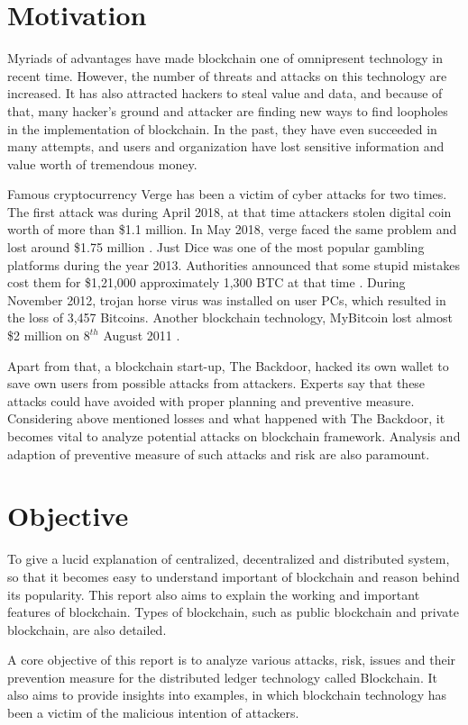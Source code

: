 \documentclass[a4paper,twoside,12pt]{report}
\begin{document}
\begin{spacing}{1.5}
\section{Motivation}
Myriads of advantages have made blockchain one of omnipresent technology in recent time. However, the number of threats and attacks on this technology are increased. It has also attracted hackers to steal value and data, and because of that, many hacker's ground and attacker are finding new ways to find loopholes in the implementation of blockchain. In the past, they have even succeeded in many attempts, and users and organization have lost sensitive information and value worth of tremendous money.
\par
Famous cryptocurrency Verge has been a victim of cyber attacks for two times. The first attack was during April 2018, at that time attackers stolen digital coin worth of more than \$1.1 million. In May 2018, verge faced the same problem and lost around \$1.75 million \cite{verge_51_attack}. Just Dice was one of the most popular gambling platforms during the year 2013. Authorities announced that some stupid mistakes cost them for \$1,21,000 approximately 1,300 BTC at that time \cite{all_bitcoin_scam}. During November 2012, trojan horse virus was installed on user PCs, which resulted in the loss of 3,457 Bitcoins. Another blockchain technology, MyBitcoin lost almost \$2 million on $8^{th}$  August 2011 \cite{mybitcoin_hack}. 
\par
Apart from that, a blockchain start-up, The Backdoor, hacked its own wallet to save own users from possible attacks from attackers. Experts say that these attacks could have avoided with proper planning and preventive measure. Considering above mentioned losses and what happened with The Backdoor, it becomes vital to analyze potential attacks on blockchain framework. Analysis and adaption of preventive measure of such attacks and risk are also paramount. 
\section{Objective}
To give a lucid explanation of centralized, decentralized and distributed system, so that it becomes easy to understand important of blockchain and reason behind its popularity. This report also aims to explain the working and important features of blockchain. Types of blockchain, such as public blockchain and private blockchain, are also detailed.  
\par
A core objective of this report is to analyze various attacks, risk, issues and their prevention measure for the distributed ledger technology called Blockchain. It also aims to provide insights into examples, in which blockchain technology has been a victim of the malicious intention of attackers.

\end{spacing}
\end{document}
